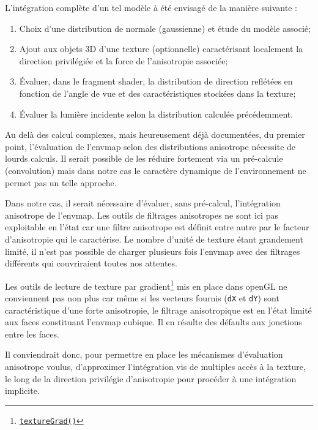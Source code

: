 \documentclass[10pt,a4paper,twoside, twocolumn]{report}
\begin{document}
L’intégration complète d'un tel modèle à été envisagé de la manière suivante :
\begin{enumerate}
	\item Choix d'une distribution de normale (gaussienne) et étude du modèle associé;
	\item Ajout aux objets 3D d'une texture (optionnelle) caractérisant localement la direction privilégiée et la force de l'anisotropie associée;
	\item Évaluer, dans le fragment shader, la distribution de direction reflétées en fonction de l'angle de vue et des caractéristiques stockées dans la texture;
	\item Évaluer la lumière incidente selon la distribution calculée précédemment.
\end{enumerate}

Au delà des calcul complexes, mais heureusement déjà documentées, du premier point\cite{Heitz2013a}, l'évaluation de l'envmap selon des distributions anisotrope nécessite de lourds calculs.
Il serait possible de les réduire fortement via un pré-calcule (convolution) mais dans notre cas le caractère dynamique de l'environnement ne permet pas un telle approche.

Dans notre cas, il serait nécessaire d'évaluer, sans pré-calcul, l’intégration anisotrope de l'envmap.
Les outils de filtrages anisotropes ne sont ici pas exploitable en l’état car une filtre anisotrope est définit entre autre par le facteur d'anisotropie qui le caractérise. Le nombre d'unité de texture étant grandement limité, il n'est pas possible de charger plusieurs fois l'envmap avec des filtrages différents qui couvriraient toutes nos attentes.

Les outils de lecture de texture par gradient\footnote{\href{https://www.opengl.org/sdk/docs/man/html/textureGrad.xhtml}{\texttt{textureGrad()}}} mis en place dans openGL ne conviennent pas non plus car même si les vecteurs fournis (\texttt{dX} et \texttt{dY}) sont caractéristique d'une forte anisotropie, le filtrage anisotropique est en l'état limité aux faces constituant l'envmap cubique. Il en résulte des défaults aux jonctions entre les faces.

Il conviendrait donc, pour permettre en place les mécanismes d'évaluation anisotrope voulus, d'approximer l’intégration vis de multiples accès à la texture, le long de la direction privilégie d’anisotropie pour procéder à une intégration implicite.

\end{document}
